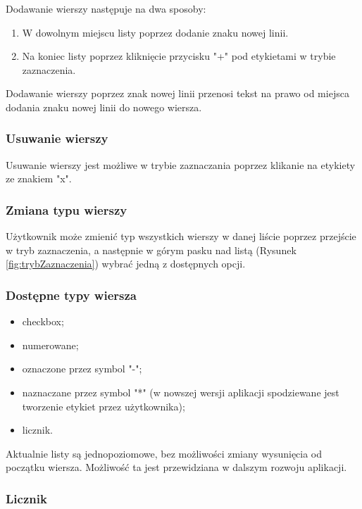 Dodawanie wierszy następuje na dwa sposoby:

\begin{enumerate}
    \item W dowolnym miejscu listy poprzez dodanie znaku nowej linii.
    \item Na koniec listy poprzez kliknięcie przycisku "+" pod etykietami w trybie zaznaczenia. 
\end{enumerate}

Dodawanie wierszy poprzez znak nowej linii przenosi tekst na prawo od miejsca dodania znaku nowej linii do nowego wiersza.

\subsubsection{Usuwanie wierszy}

Usuwanie wierszy jest możliwe w trybie zaznaczania poprzez klikanie na etykiety ze znakiem "x".

\subsubsection{Zmiana typu wierszy}

Użytkownik może zmienić typ wszystkich wierszy w danej liście poprzez przejście w tryb zaznaczenia, a następnie w górym pasku nad listą (Rysunek \ref{fig:trybZaznaczenia}) wybrać jedną z dostępnych opcji.

\subsubsection{Dostępne typy wiersza}

\begin{itemize}
    \item checkbox;
    \item numerowane;
    \item oznaczone przez symbol "\--{}";
    \item naznaczane przez symbol "*" (w nowszej wersji aplikacji spodziewane jest tworzenie etykiet przez użytkownika);
    \item licznik.
\end{itemize}

Aktualnie listy są jednopoziomowe, bez możliwości zmiany wysunięcia od początku wiersza. Możliwość ta jest przewidziana w dalszym rozwoju aplikacji.

\subsubsection{Licznik}


